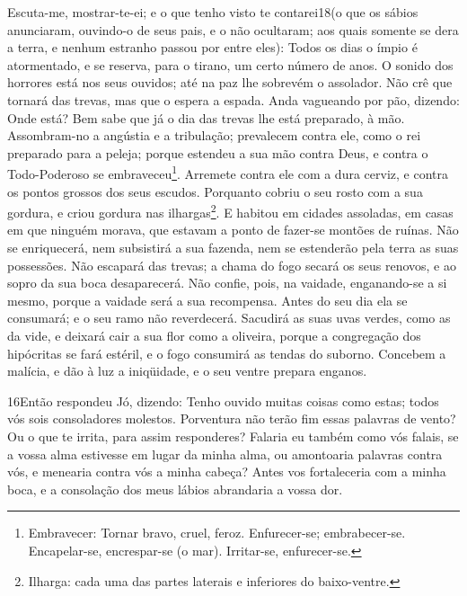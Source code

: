 Escuta-me, mostrar-te-ei; e o que tenho visto te contarei18(o que
os sábios anunciaram, ouvindo-o de seus pais, e o não ocultaram;
aos quais somente se dera a terra, e nenhum estranho passou
por entre eles): Todos os dias o ímpio é atormentado, e se
reserva, para o tirano, um certo número de anos. O sonido dos
horrores está nos seus ouvidos; até na paz lhe sobrevém o assolador.
Não crê que tornará das trevas, mas que o espera a espada.
Anda vagueando por pão, dizendo: Onde está? Bem sabe que já o
dia das trevas lhe está preparado, à mão. Assombram-no a
angústia e a tribulação; prevalecem contra ele, como o rei preparado
para a peleja; porque estendeu a sua mão contra Deus, e
contra o Todo-Poderoso se embraveceu\footnote{Embravecer: Tornar
bravo, cruel, feroz. Enfurecer-se; embrabecer-se. Encapelar-se,
encrespar-se (o mar). Irritar-se, enfurecer-se.}. Arremete
contra ele com a dura cerviz, e contra os pontos grossos dos seus
escudos. Porquanto cobriu o seu rosto com a sua gordura, e
criou gordura nas ilhargas\footnote{Ilharga: cada uma das partes
laterais e inferiores do baixo-ventre.}. E habitou em cidades
assoladas, em casas em que ninguém morava, que estavam a ponto de
fazer-se montões de ruínas. Não se enriquecerá, nem
subsistirá a sua fazenda, nem se estenderão pela terra as suas
possessões. Não escapará das trevas; a chama do fogo secará
os seus renovos, e ao sopro da sua boca desaparecerá. Não
confie, pois, na vaidade, enganando-se a si mesmo, porque a vaidade
será a sua recompensa. Antes do seu dia ela se consumará; e o
seu ramo não reverdecerá. Sacudirá as suas uvas verdes, como
as da vide, e deixará cair a sua flor como a oliveira, porque
a congregação dos hipócritas se fará estéril, e o fogo consumirá as
tendas do suborno. Concebem a malícia, e dão à luz a
iniqüidade, e o seu ventre prepara enganos.

\medskip

\lettrine{16} Então respondeu Jó, dizendo: Tenho ouvido
muitas coisas como estas; todos vós sois consoladores molestos.
Porventura não terão fim essas palavras de vento? Ou o que te
irrita, para assim responderes? Falaria eu também como vós
falais, se a vossa alma estivesse em lugar da minha alma, ou
amontoaria palavras contra vós, e menearia contra vós a minha
cabeça? Antes vos fortaleceria com a minha boca, e a consolação
dos meus lábios abrandaria a vossa dor.


